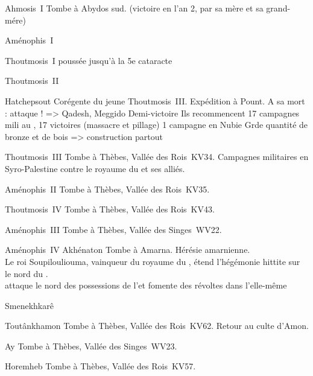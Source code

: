 \begin{listerois}
  \item [Ahmosis~I\ier \datation{(c.~1550-1525)}] Tombe à Abydos sud.
        (victoire en l'an 2, par sa mère et sa grand-mére)
  \item [Aménophis~I\ier \datation{(c.~1525-1504)}]
  \item [Thoutmosis~I\ier \datation{(c.~1504-1492)}] 
        poussée jusqu'à la 5e cataracte
  \item [Thoutmosis~II \datation{(c.~1492-1479)}]
  \item [Hatchepsout \datation{(c.~1479-1458)}] 
        Corégente du jeune Thoutmosis~III. Expédition à Pount.
        A sa mort : \Mtn attaque ! => Qadesh, Meggido
        Demi-victoire
        Ils recommencent
        17 campagnes mili au \PO, 17 victoires (massacre et pillage)
        1 campagne en Nubie
        Grde quantité de bronze et de bois => construction partout
  \item [Thoutmosis~III \datation{(c.~1479-1425)}] 
        Tombe à Thèbes, Vallée des Rois~KV34. Campagnes militaires 
        en Syro-Palestine contre le royaume du \Mtn et ses alliés.
  \item [Aménophis~II \datation{(c.~1425-1397)}] 
        Tombe à Thèbes, Vallée des Rois~KV35.
  \item [Thoutmosis~IV \datation{(c.~1397-1388)}] 
        Tombe à Thèbes, Vallée des Rois~KV43.
  \item [Aménophis~III \datation{(c.~1388-1350)}] 
        Tombe à Thèbes, Vallée des Singes~WV22.
  \item [Aménophis~IV Akhénaton \datation{(c.~1350-1334)}] 
        Tombe à Amarna. Hérésie amarnienne. \\
        Le roi Soupilouliouma, vainqueur du royaume du \Mtn, 
        étend l'hégémonie hittite sur le nord du \PO. \\
        attaque le nord des possessions de l'\kmt et fomente des 
        révoltes dans l'\kmt elle-même
  \item [Smenekhkarê \datation{(c.~1337-1333)}]
  \item [Toutânkhamon \datation{(c.~1333-1323)}] 
        Tombe à Thèbes, Vallée des Rois~KV62. Retour au culte d'Amon.
  \item [Ay \datation{(c.~1323-1319)}] 
        Tombe à Thèbes, Vallée des Singes~WV23.
  \item [Horemheb \datation{(c. 1319-1292)}] 
        Tombe à Thèbes, Vallée des Rois~KV57.
\end{listerois}

